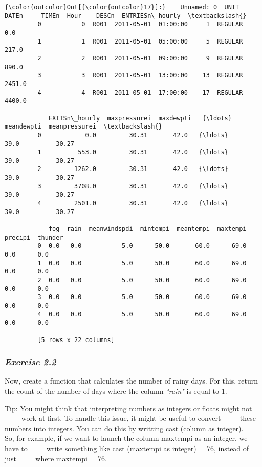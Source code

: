 \documentclass[11pt]{article}
\begin{document}
\begin{Verbatim}[commandchars=\\\{\}]
{\color{outcolor}Out[{\color{outcolor}17}]:}    Unnamed: 0  UNIT       DATEn     TIMEn  Hour    DESCn  ENTRIESn\_hourly  \textbackslash{}
         0           0  R001  2011-05-01  01:00:00     1  REGULAR              0.0   
         1           1  R001  2011-05-01  05:00:00     5  REGULAR            217.0   
         2           2  R001  2011-05-01  09:00:00     9  REGULAR            890.0   
         3           3  R001  2011-05-01  13:00:00    13  REGULAR           2451.0   
         4           4  R001  2011-05-01  17:00:00    17  REGULAR           4400.0   
         
            EXITSn\_hourly  maxpressurei  maxdewpti   {\ldots}     meandewpti  meanpressurei  \textbackslash{}
         0            0.0         30.31       42.0   {\ldots}           39.0          30.27   
         1          553.0         30.31       42.0   {\ldots}           39.0          30.27   
         2         1262.0         30.31       42.0   {\ldots}           39.0          30.27   
         3         3708.0         30.31       42.0   {\ldots}           39.0          30.27   
         4         2501.0         30.31       42.0   {\ldots}           39.0          30.27   
         
            fog  rain  meanwindspdi  mintempi  meantempi  maxtempi  precipi  thunder  
         0  0.0   0.0           5.0      50.0       60.0      69.0      0.0      0.0  
         1  0.0   0.0           5.0      50.0       60.0      69.0      0.0      0.0  
         2  0.0   0.0           5.0      50.0       60.0      69.0      0.0      0.0  
         3  0.0   0.0           5.0      50.0       60.0      69.0      0.0      0.0  
         4  0.0   0.0           5.0      50.0       60.0      69.0      0.0      0.0  
         
         [5 rows x 22 columns]
\end{Verbatim}
            
    \subsubsection{\texorpdfstring{\emph{Exercise
2.2}}{Exercise 2.2}}\label{exercise-2.2}

Now, create a function that calculates the number of rainy days. For
this, return the count of the number of days where the column
\emph{"rain"} is equal to 1.

Tip: You might think that interpreting numbers as integers or floats
might not ~~~~ work at first. To handle this issue, it might be useful
to convert ~~~~ these numbers into integers. You can do this by writting
cast (column as integer). ~~~~ So, for example, if we want to launch the
column maxtempi as an integer, we have to ~~~~ write something like cast
(maxtempi as integer) = 76, instead of just ~~~~ where maxtempi = 76.
\end{document}
